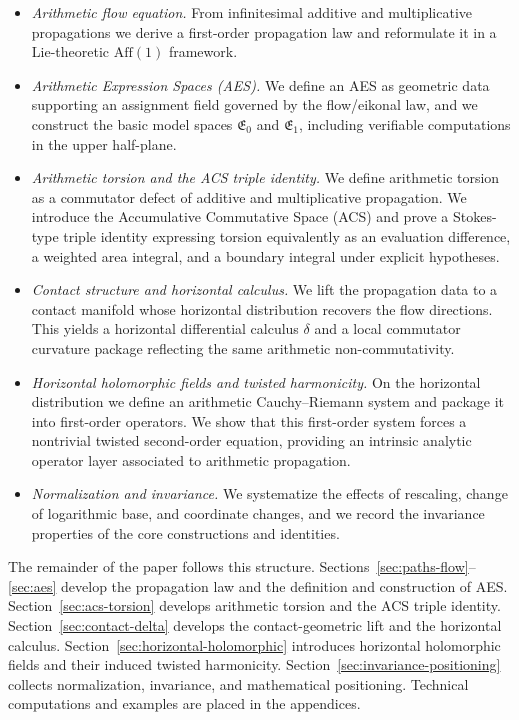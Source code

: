\begin{itemize}
    \item \emph{Arithmetic flow equation.} From infinitesimal additive and multiplicative propagations we derive a first-order propagation law and reformulate it in a Lie-theoretic \texorpdfstring{$\mathrm{Aff}(1)$}{Aff(1)} framework.
    \item \emph{Arithmetic Expression Spaces (AES).} We define an AES as geometric data supporting an assignment field governed by the flow/eikonal law, and we construct the basic model spaces \texorpdfstring{$\mathfrak{E}_0$}{E0} and \texorpdfstring{$\mathfrak{E}_1$}{E1}, including verifiable computations in the upper half-plane.
    \item \emph{Arithmetic torsion and the ACS triple identity.} We define arithmetic torsion as a commutator defect of additive and multiplicative propagation. We introduce the Accumulative Commutative Space (ACS) and prove a Stokes-type triple identity expressing torsion equivalently as an evaluation difference, a weighted area integral, and a boundary integral under explicit hypotheses.
    \item \emph{Contact structure and horizontal calculus.} We lift the propagation data to a contact manifold whose horizontal distribution recovers the flow directions. This yields a horizontal differential calculus \texorpdfstring{$\delta$}{delta} and a local commutator curvature package reflecting the same arithmetic non-commutativity.
    \item \emph{Horizontal holomorphic fields and twisted harmonicity.} On the horizontal distribution we define an arithmetic Cauchy--Riemann system and package it into first-order operators. We show that this first-order system forces a nontrivial twisted second-order equation, providing an intrinsic analytic operator layer associated to arithmetic propagation.
    \item \emph{Normalization and invariance.} We systematize the effects of rescaling, change of logarithmic base, and coordinate changes, and we record the invariance properties of the core constructions and identities.
\end{itemize}

The remainder of the paper follows this structure. Sections~\ref{sec:paths-flow}--\ref{sec:aes} develop the propagation law and the definition and construction of AES. Section~\ref{sec:acs-torsion} develops arithmetic torsion and the ACS triple identity. Section~\ref{sec:contact-delta} develops the contact-geometric lift and the horizontal calculus. Section~\ref{sec:horizontal-holomorphic} introduces horizontal holomorphic fields and their induced twisted harmonicity. Section~\ref{sec:invariance-positioning} collects normalization, invariance, and mathematical positioning. Technical computations and examples are placed in the appendices.

